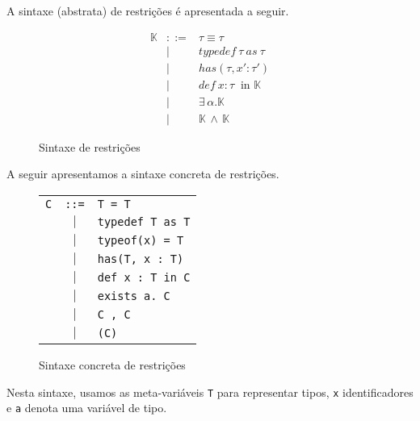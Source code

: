\documentclass[a4paper,8pt]{article}
\begin{document}
     A sintaxe (abstrata) de restrições é apresentada a seguir. 

     \begin{figure}[h]
        \[
             \begin{array}{lcl}
                 \mathbb{K} & ::= & \tau \equiv \tau \\
                                    & \mid & typedef\:\tau\:as\:\tau \\
                                    & \mid & has(\tau, x' : \tau') \\
                                    & \mid & def\:x:\tau\:\text{ in
                                             }\mathbb{K}\\
                                    & \mid &
                                             \exists\,\alpha.\mathbb{K}\\
                                    & \mid & \mathbb{K}\,\land\,\mathbb{K}
             \end{array}
        \]
        \centering
        \caption{Sintaxe de restrições}
        \label{figconstrsyn}
      \end{figure}

      A seguir apresentamos a sintaxe concreta de restrições.

     \begin{figure}[h]
       \begin{tabular}{lcl}
          \texttt{C} & \texttt{::=} & \texttt{T = T} \\
                          & $\mid$     & \texttt{typedef T as T}\\
                          & $\mid$     & \texttt{typeof(x) = T}\\
                          & $\mid$     & \texttt{has(T, x : T)}\\
                          & $\mid$     & \texttt{def x : T in C}\\
                          & $\mid$     & \texttt{exists a. C}\\
                          & $\mid$     & \texttt{C , C}\\
                          & $\mid$     & \texttt{(C)}\\
       \end{tabular}
        \centering
        \caption{Sintaxe concreta de restrições}
        \label{concreta}
      \end{figure}

      Nesta sintaxe, usamos as meta-variáveis \texttt{T} para
      representar tipos, \texttt{x} identificadores e \texttt{a}
      denota uma variável de tipo.
\end{document}
